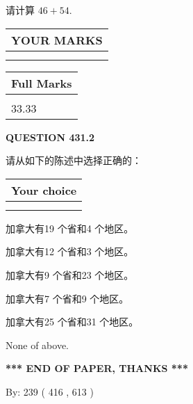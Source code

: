 \documentclass{ctexart}
\begin{document}
  
 
请计算 $ %
46 +  %
54 $.
 

 

 
  
\vspace{0.2in}
  
\noindent\begin{tabular}{|l|}
\hline
 YOUR MARKS  \\
\hline
 \\ 
 \\ 
\hline
\end{tabular}
\hspace{0.05in} \begin{tabular}{|l|}
\hline
 Full Marks  \\
\hline
 \\ 
33.33 \\
\hline
\end{tabular}
{\textbf{\Large{QUESTION
431.2 
}}}
  
  
请从如下的陈述中选择正确的：
  
  
\noindent\hspace{3.0in} \begin{tabular}{|l|}
\hline
Your choice \\
\hline
 \\ 
 \\ 
\hline
\end{tabular}
  
  
 
 
加拿大有19 个省和4 个地区。
 
 
加拿大有12 个省和3 个地区。
 
 
加拿大有9 个省和23 个地区。
 
 
加拿大有7 个省和9 个地区。
 
 
加拿大有25 个省和31 个地区。
 
 
 None of above.
 
 
   
   
 \vspace{0.2in}
 
   
   
   
   
\vspace{1.0in} 
{\textbf{\large{ *** END OF PAPER, THANKS *** }}} 
   
   
\hspace{1.0in} By: 
 239 ( 416 ,  613 )
   
\end{document}
